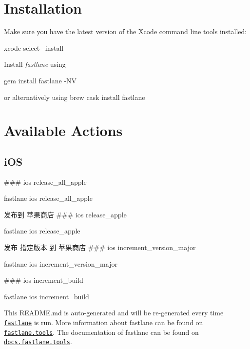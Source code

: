 \section*{Installation}

Make sure you have the latest version of the Xcode command line tools installed\+:


\begin{DoxyCode}
xcode-select --install
\end{DoxyCode}


Install {\itshape fastlane} using 
\begin{DoxyCode}
[sudo] gem install fastlane -NV
\end{DoxyCode}
 or alternatively using {\ttfamily brew cask install fastlane}

\section*{Available Actions}

\subsection*{i\+OS}

\#\#\# ios release\+\_\+all\+\_\+apple 
\begin{DoxyCode}
fastlane ios release\_all\_apple
\end{DoxyCode}
 发布到 苹果商店 \#\#\# ios release\+\_\+apple 
\begin{DoxyCode}
fastlane ios release\_apple
\end{DoxyCode}
 发布 指定版本 到 苹果商店 \#\#\# ios increment\+\_\+version\+\_\+major 
\begin{DoxyCode}
fastlane ios increment\_version\_major
\end{DoxyCode}


\#\#\# ios increment\+\_\+build 
\begin{DoxyCode}
fastlane ios increment\_build
\end{DoxyCode}






This R\+E\+A\+D\+M\+E.\+md is auto-\/generated and will be re-\/generated every time \href{https://fastlane.tools}{\tt fastlane} is run. More information about fastlane can be found on \href{https://fastlane.tools}{\tt fastlane.\+tools}. The documentation of fastlane can be found on \href{https://docs.fastlane.tools}{\tt docs.\+fastlane.\+tools}. 